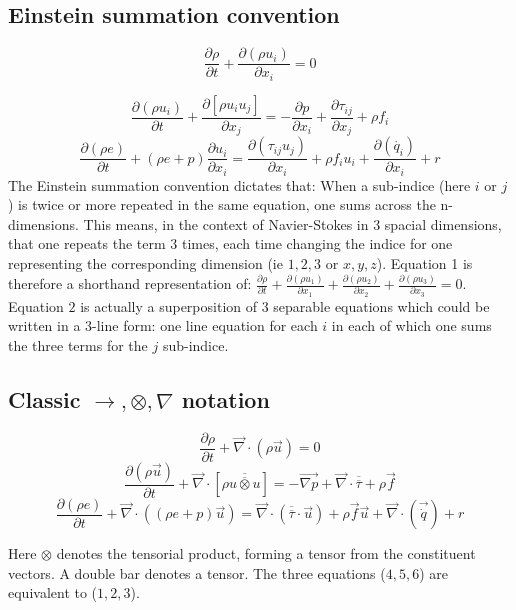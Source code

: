 \subsection{Einstein summation convention}

\begin{equation}
\frac{\partial \rho}{\partial t} + \frac{\partial(\rho u_{i})}{\partial x_{i}} = 0
\end{equation}

\begin{equation}
\frac{\partial (\rho u_{i})}{\partial t} + \frac{\partial[\rho u_{i}u_{j}]}{\partial x_{j}} = -\frac{\partial p}{\partial x_{i}} + \frac{\partial \tau_{ij}}{\partial x_{j}} + \rho f_{i} \end{equation}
\begin{equation}
\frac{\partial (\rho e)}{\partial t} + (\rho e+p)\frac{\partial u_{i}}{\partial x_{i}} = \frac{\partial(\tau_{ij}u_{j})}{\partial x_{i}} + \rho f_{i}u_{i} + \frac{\partial(\dot{ q_{i}})}{\partial x_{i}} + r \end{equation}
The Einstein summation convention dictates that: When a sub-indice (here $i$ or $j$) is twice or more repeated in the same equation, one sums across the n-dimensions. 
This means, in the context of Navier-Stokes in 3 spacial dimensions, that one repeats the term 3 times, each time changing the indice for one representing the corresponding dimension (ie $1,2,3$ or $x,y,z$). Equation 1 is therefore a shorthand representation of: $\frac{\partial \rho}{\partial t}+\frac{\partial(\rho u_{1})}{\partial x_{1}}+\frac{\partial(\rho u_{2})}{\partial x_{2}}+ \frac{\partial(\rho u_{3})}{\partial x_{3}}=0$.
Equation $2$ is actually a superposition of 3 separable equations which could be written in a 3-line form: one line equation for each $i$ in each of which one sums the three terms for the $j$ sub-indice.
\subsection{Classic $\longrightarrow , \otimes , \nabla$ notation}
\begin{equation}
\frac{\partial \rho}{\partial t} + \overrightarrow{\nabla}\cdot(\rho\overrightarrow{u})=0 \end{equation}
\begin{equation}
\frac{\partial(\rho \overrightarrow{u})}{\partial t} + \overrightarrow{\nabla}\cdot[\rho\overline{\overline{u\otimes u}}] = -\overrightarrow{\nabla p} + \overrightarrow{\nabla}\cdot\overline{\overline{\tau}} + \rho\overrightarrow{f} \end{equation}
\begin{equation}
\frac{\partial(\rho e)}{\partial t} + \overrightarrow{\nabla}\cdot((\rho e + p)\overrightarrow{u}) = \overrightarrow{\nabla}\cdot(\overline{\overline{\tau}}\cdot\overrightarrow{u}) + \rho\overrightarrow{f}\overrightarrow{u} + \overrightarrow{\nabla}\cdot(\overrightarrow{\dot{q}})+r \end{equation}

Here $\otimes$ denotes the tensorial product, forming a tensor from the constituent vectors. A double bar denotes a tensor. The three equations ($4,5,6$) are equivalent to ($1,2,3$).

